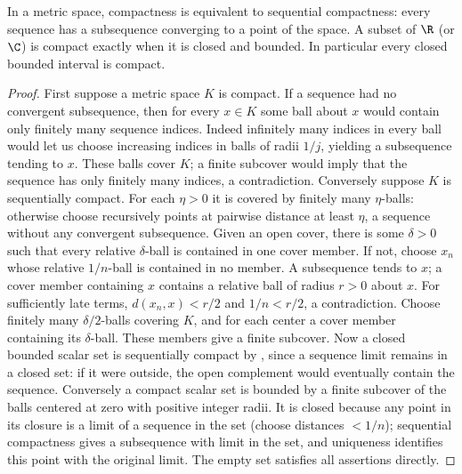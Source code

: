 \begin{theorem}
In a metric space, compactness is equivalent to sequential compactness: every sequence has a subsequence converging to a point of the space. A subset of $\R$ (or $\C$) is compact exactly when it is closed and bounded. In particular every closed bounded interval is compact.
\end{theorem}
\begin{proof}
First suppose a metric space $K$ is compact. If a sequence had no convergent subsequence, then for every $x\in K$ some ball about $x$ would contain only finitely many sequence indices. Indeed infinitely many indices in every ball would let us choose increasing indices in balls of radii $1/j$, yielding a subsequence tending to $x$. These balls cover $K$; a finite subcover would imply that the sequence has only finitely many indices, a contradiction.
Conversely suppose $K$ is sequentially compact. For each $\eta>0$ it is covered by finitely many $\eta$-balls: otherwise choose recursively points at pairwise distance at least $\eta$, a sequence without any convergent subsequence. Given an open cover, there is some $\delta>0$ such that every relative $\delta$-ball is contained in one cover member. If not, choose $x_n$ whose relative $1/n$-ball is contained in no member. A subsequence tends to $x$; a cover member containing $x$ contains a relative ball of radius $r>0$ about $x$. For sufficiently late terms, $d(x_n,x)<r/2$ and $1/n<r/2$, a contradiction. Choose finitely many $\delta/2$-balls covering $K$, and for each center a cover member containing its $\delta$-ball. These members give a finite subcover.
Now a closed bounded scalar set is sequentially compact by , since a sequence limit remains in a closed set: if it were outside, the open complement would eventually contain the sequence. Conversely a compact scalar set is bounded by a finite subcover of the balls centered at zero with positive integer radii. It is closed because any point in its closure is a limit of a sequence in the set (choose distances $<1/n$); sequential compactness gives a subsequence with limit in the set, and uniqueness identifies this point with the original limit. The empty set satisfies all assertions directly.
\end{proof}

